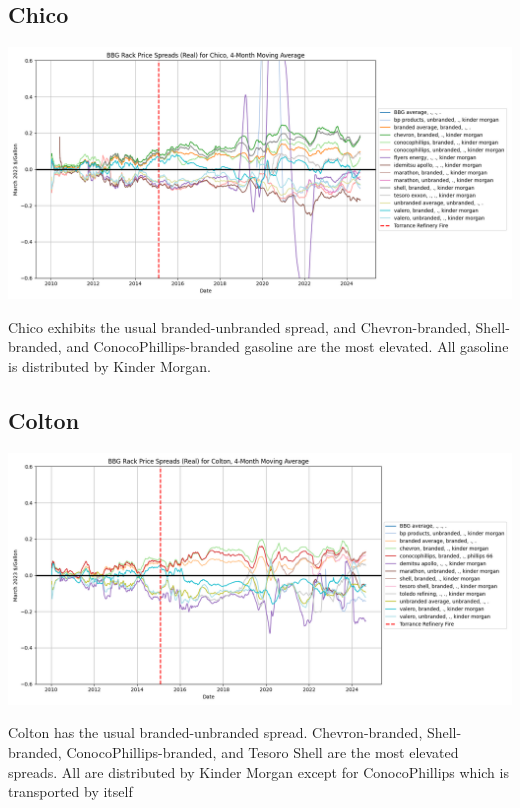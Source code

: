 \documentclass{article}
\begin{document}
\subsection{Chico}
\centering \includegraphics[width=5.5in]{chico_spread.png}\\
\raggedright Chico exhibits the usual branded-unbranded spread, and Chevron-branded, Shell-branded, and ConocoPhillips-branded gasoline are the most elevated. All gasoline is distributed by Kinder Morgan.

\subsection{Colton}
\centering \includegraphics[width=5.5in]{colton_spread.png}\\
\raggedright Colton has the usual branded-unbranded spread. Chevron-branded, Shell-branded, ConocoPhillips-branded, and Tesoro Shell are the most elevated spreads. All are distributed by Kinder Morgan except for ConocoPhillips which is transported by itself
\end{document}
